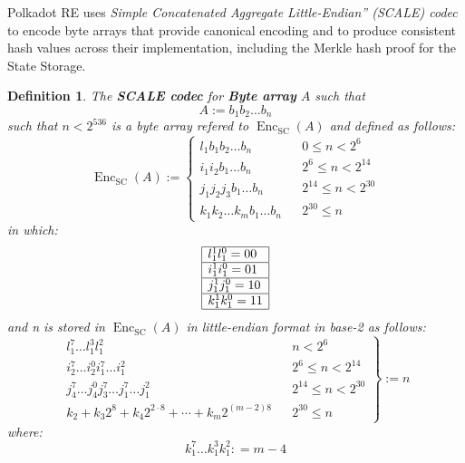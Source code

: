 \documentclass{article}
\newcommand{\assign}{:=}
\newcommand{\cdummy}{\cdot}
\newcommand{\nosymbol}{}
\newcommand{\tmem}[1]{{\em #1\/}}
\newcommand{\tmop}[1]{\ensuremath{\operatorname{#1}}}
\newcommand{\tmstrong}[1]{\textbf{#1}}
\newcommand{\tmtextbf}[1]{{\bfseries{#1}}}
\newcommand{\tmtextit}[1]{{\itshape{#1}}}
\newtheorem{definition}{Definition}
\providecommand{\cdummy}{{\cdot}}
\providecommand{\nosymbol}{}
\providecommand{\tmem}[1]{\tmtextit{#1}}
\providecommand{\tmop}[1]{\ensuremath{\mathrm{#1}}}
\providecommand{\tmstrong}[1]{\tmtextbf{#1}}
\providecommand{\tmtextbf}[1]{\tmtextbf{#1}}
\providecommand{\tmtextit}[1]{\tmtextit{#1}}
\newtheorem{definition}{Definition}
\begin{document}
Polkadot RE uses {\tmem{Simple Concatenated Aggregate Little-Endian'' (SCALE)
codec}} to encode byte arrays that provide canonical encoding and to produce
consistent hash values across their implementation, including the Merkle hash
proof for the State Storage.

\begin{definition}
  \label{def-scale-codec}The {\tmstrong{SCALE codec}} for {\tmstrong{Byte
  array}} $A$ such that
  \[ A \assign b_1 b_2 \ldots b_n \]
  such that $n < 2^{536}$ is a byte array refered to $\tmop{Enc}_{\tmop{SC}}
  (A)$ and defined as follows:
  \[ \tmop{Enc}_{\tmop{SC}} (A) \assign \left\{ \begin{array}{lll}
       l^{\nosymbol}_1 b_1 b_2 \ldots b_n &  & 0 \leqslant n < 2^6\\
       i^{\nosymbol}_1 i^{\nosymbol}_2 b_1 \ldots b_n &  & 2^6 \leqslant n <
       2^{14}\\
       j^{\nosymbol}_1 j^{\nosymbol}_2 j_3 b_1 \ldots b_n &  & 2^{14}
       \leqslant n < 2^{30}\\
       k_1^{\nosymbol} k_2^{\nosymbol} \ldots k_m^{\nosymbol} b_1 \ldots b_n &
       & 2^{30} \leqslant n
     \end{array} \right. \]
  in which:{\hspace{0.17em}}
  \[ \begin{array}{|l|}
       \hline
       l^1_1 l_1^0 = 00\\
       \hline
       i^1_1 i_1^0 = 01\\
       \hline
       j^1_1 j_1^0 = 10\\
       \hline
       k^1_1 k_1^0 = 11\\
       \hline
     \end{array} \]
  and n is stored in $\tmop{Enc}_{\tmop{SC}} (A)$ in little-endian format in
  base-2 as follows:
  \[ \left. \begin{array}{lll}
       l^7_1 \ldots l^3_1 l^2_1 &  & n < 2^6\\
       i_2^7 \ldots i_2^0 i_1^7 \ldots i^2_1^{\nosymbol} &  & 2^6 \leqslant n
       < 2^{14}\\
       j_4^7 \ldots j_4^0 j_3^7 \ldots j_1^7 \ldots j^2_1 &  & 2^{14}
       \leqslant n < 2^{30}\\
       k_2 + k_3 2^8 + k_4 2^{2 \cdummy 8} + \cdots + k_m 2^{(m - 2) 8} &  &
       2^{30} \leqslant n
     \end{array} \right\} \assign n \]
  where:
  \[ k^7_1 \ldots k^3_1 k^2_1 : = m - 4 \]
\end{definition}
\end{document}
